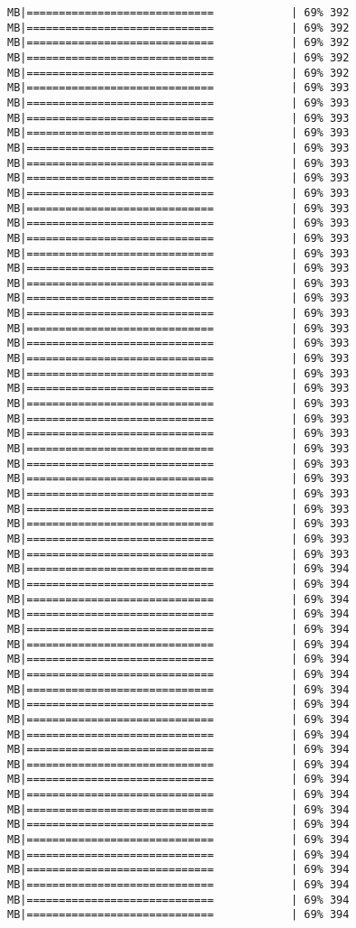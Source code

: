 \documentclass[
]{article}
\begin{document}
\begin{verbatim}
MB|=============================            | 69% 392 MB|=============================            | 69% 392 MB|=============================            | 69% 392 MB|=============================            | 69% 392 MB|=============================            | 69% 392 MB|=============================            | 69% 393 MB|=============================            | 69% 393 MB|=============================            | 69% 393 MB|=============================            | 69% 393 MB|=============================            | 69% 393 MB|=============================            | 69% 393 MB|=============================            | 69% 393 MB|=============================            | 69% 393 MB|=============================            | 69% 393 MB|=============================            | 69% 393 MB|=============================            | 69% 393 MB|=============================            | 69% 393 MB|=============================            | 69% 393 MB|=============================            | 69% 393 MB|=============================            | 69% 393 MB|=============================            | 69% 393 MB|=============================            | 69% 393 MB|=============================            | 69% 393 MB|=============================            | 69% 393 MB|=============================            | 69% 393 MB|=============================            | 69% 393 MB|=============================            | 69% 393 MB|=============================            | 69% 393 MB|=============================            | 69% 393 MB|=============================            | 69% 393 MB|=============================            | 69% 393 MB|=============================            | 69% 393 MB|=============================            | 69% 393 MB|=============================            | 69% 393 MB|=============================            | 69% 393 MB|=============================            | 69% 393 MB|=============================            | 69% 393 MB|=============================            | 69% 394 MB|=============================            | 69% 394 MB|=============================            | 69% 394 MB|=============================            | 69% 394 MB|=============================            | 69% 394 MB|=============================            | 69% 394 MB|=============================            | 69% 394 MB|=============================            | 69% 394 MB|=============================            | 69% 394 MB|=============================            | 69% 394 MB|=============================            | 69% 394 MB|=============================            | 69% 394 MB|=============================            | 69% 394 MB|=============================            | 69% 394 MB|=============================            | 69% 394 MB|=============================            | 69% 394 MB|=============================            | 69% 394 MB|=============================            | 69% 394 MB|=============================            | 69% 394 MB|=============================            | 69% 394 MB|=============================            | 69% 394 MB|=============================            | 69% 394 MB|=============================            | 69% 394 MB|=============================            | 69% 394 
\end{verbatim}
\end{document}
